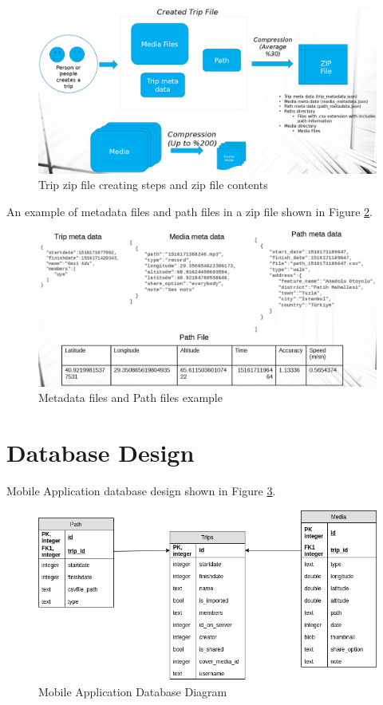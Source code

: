 \begin{figure}[!htbp]
\centering
\includegraphics[width=\textwidth]{projectChapters/images/creatingZipFile.png}
\caption{Trip zip file creating steps and zip file contents}
\label{fig:creatingZipFile}
\end{figure}

An example of metadata files and path files in a zip file shown in Figure \ref{fig:metadata}.

\begin{figure}[!htbp]
\centering
\includegraphics[width=\textwidth]{projectChapters/images/metadata.png}
\caption{Metadata files and Path files example}
\label{fig:metadata}
\end{figure}

\newpage

\section{Database Design}

Mobile Application database design shown in Figure \ref{fig:mobileApplicationDatabaseDiagram}.
\begin{figure}[!htbp]
\centering
\includegraphics[width=\textwidth]{projectChapters/images/android_database.png}
\caption{Mobile Application Database Diagram}
\label{fig:mobileApplicationDatabaseDiagram}
\end{figure}

